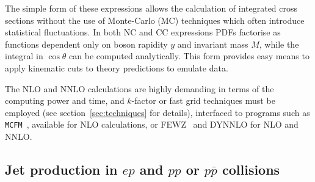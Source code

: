 The simple form of these expressions allows the calculation of integrated
cross sections without the use of Monte-Carlo (MC) techniques which often 
introduce statistical fluctuations.
In both NC and CC expressions PDFs
factorise as functions dependent only on boson rapidity \(y\) and
invariant mass \(M\), while
the integral in \(\cos\theta\) can be computed analytically. This form 
provides easy means to apply kinematic cuts to theory predictions to emulate
data.

The NLO and NNLO calculations are 
highly demanding
in terms of the computing power and time, and $k$-factor or fast grid techniques must be employed (see section~\ref{sec:techniques}
for details), interfaced to programs such as
\texttt{MCFM}~\cite{Campbell:1999ah,Campbell:2000je,Campbell:2010ff}, 
available for NLO calculations, or 
FEWZ~\cite{FEWZ} and DYNNLO \cite{DYNNLO} for NLO and NNLO.
 






\subsection{Jet production in $ep$ and $pp$ or $p \bar p$ collisions}
\label{jetsection}

